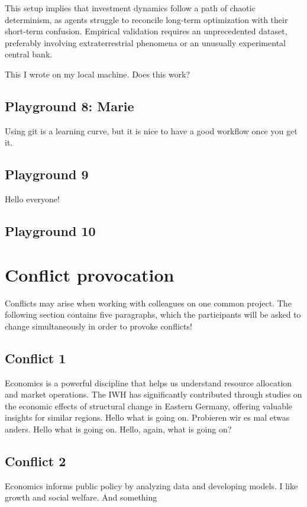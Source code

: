 \documentclass{article}
\begin{document}
This setup implies that investment dynamics follow a path of chaotic determinism, as agents struggle to reconcile long-term optimization with their short-term confusion. Empirical validation requires an unprecedented dataset, preferably involving extraterrestrial phenomena or an unusually experimental central bank.

This I wrote on my local machine. Does this work?


\subsection{Playground 8: Marie}

Using git is a learning curve, but it is nice to have a good workflow once you get it. 

\subsection{Playground 9}
Hello everyone!
\subsection{Playground 10}




\section{Conflict provocation}
Conflicts may arise when working with colleagues on one common project. The following section contains five paragraphs, which the participants will be asked to change simultaneously in order to provoke conflicts!

\subsection{Conflict 1}
Economics is a powerful discipline that helps us understand resource allocation and market operations. The IWH has significantly contributed through studies on the economic effects of structural change in Eastern Germany, offering valuable insights for similar regions.
Hello what is going on. Probieren wir es mal etwas anders.
Hello what is going on. Hello, again, what is going on?

\subsection{Conflict 2}
Economics informs public policy by analyzing data and developing models. I like growth and social welfare. And something 
\end{document}
